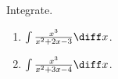 Integrate.
\begin{enumerate}
\item $\int \frac{x^3}{x^2+2x-3}\diff x$.
\item $\int \frac{x^3}{x^2+3x-4}\diff x$.
\end{enumerate}